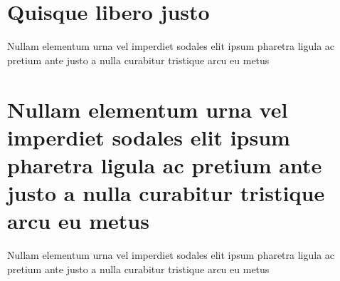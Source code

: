 
\begin{apendicesenv}

\partapendices

\chapter{Quisque libero justo}

Nullam elementum urna vel imperdiet sodales elit ipsum pharetra ligula
ac pretium ante justo a nulla curabitur tristique arcu eu metus

\chapter{Nullam elementum urna vel imperdiet sodales elit ipsum pharetra ligula
ac pretium ante justo a nulla curabitur tristique arcu eu metus}


Nullam elementum urna vel imperdiet sodales elit ipsum pharetra ligula
ac pretium ante justo a nulla curabitur tristique arcu eu metus

\end{apendicesenv}